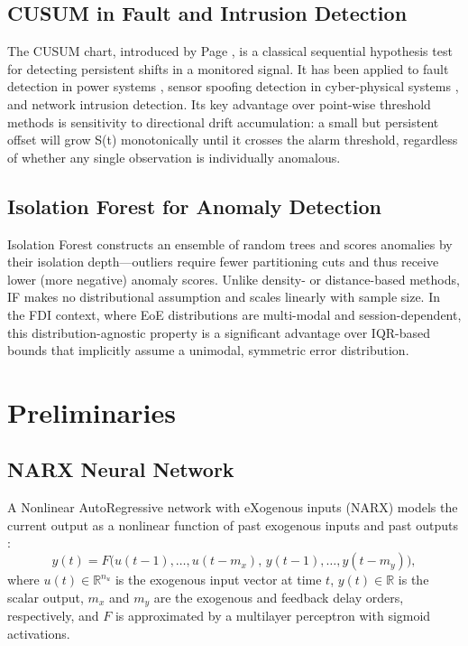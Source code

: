 \documentclass[journal]{IEEEtran}
\begin{document}
\subsection{CUSUM in Fault and Intrusion Detection}
The CUSUM chart, introduced by Page \cite{page1954}, is a classical
sequential hypothesis test for detecting persistent shifts in a monitored
signal. It has been applied to fault detection in power systems
\cite{alcaraz2017}, sensor spoofing detection in cyber-physical systems
\cite{musleh2020}, and network intrusion detection. Its key advantage
over point-wise threshold methods is sensitivity to directional drift
accumulation: a small but persistent offset will grow S(t) monotonically
until it crosses the alarm threshold, regardless of whether any single
observation is individually anomalous.

\subsection{Isolation Forest for Anomaly Detection}
Isolation Forest \cite{liu2008isolation} constructs an ensemble of
random trees and scores anomalies by their isolation depth---outliers
require fewer partitioning cuts and thus receive lower (more negative)
anomaly scores. Unlike density- or distance-based methods, IF makes no
distributional assumption and scales linearly with sample size. In the
FDI context, where EoE distributions are multi-modal and session-dependent,
this distribution-agnostic property is a significant advantage over
IQR-based bounds that implicitly assume a unimodal, symmetric error
distribution.

\section{Preliminaries}
\label{sec:prelim}

\subsection{NARX Neural Network}

A Nonlinear AutoRegressive network with eXogenous inputs (NARX) models
the current output as a nonlinear function of past exogenous inputs and
past outputs \cite{siegelmann1997}:
\begin{equation}
y(t) = F\bigl(u(t{-}1),\ldots,u(t{-}m_x),\,
              y(t{-}1),\ldots,y(t{-}m_y)\bigr),
\label{eq:narx}
\end{equation}
where $u(t) \in \mathbb{R}^{n_u}$ is the exogenous input vector at
time $t$, $y(t) \in \mathbb{R}$ is the scalar output, $m_x$ and $m_y$
are the exogenous and feedback delay orders, respectively, and $F$ is
approximated by a multilayer perceptron with sigmoid activations.
\end{document}
